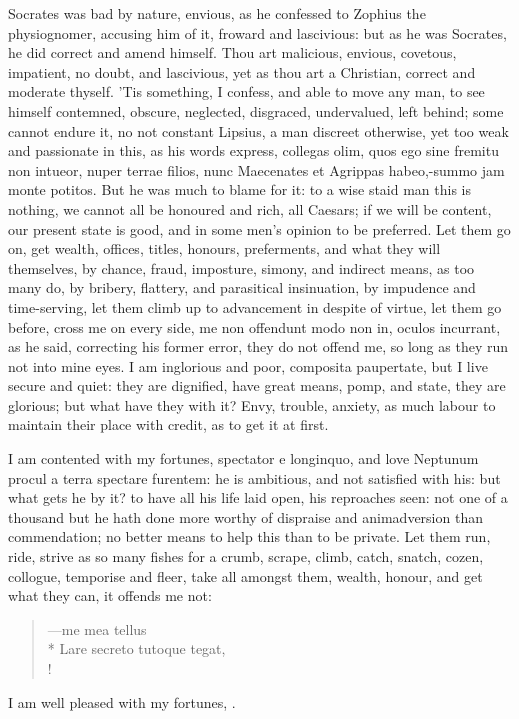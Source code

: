 {Socrates was bad by nature, envious, as he confessed to Zophius the
physiognomer, accusing him of it, froward and lascivious: but as he was
Socrates, he did correct and amend himself. Thou art malicious,
envious, covetous, impatient, no doubt, and lascivious, yet as thou art
a Christian, correct and moderate thyself. 'Tis something, I confess,
and able to move any man, to see himself contemned, obscure, neglected,
disgraced, undervalued, left behind; some cannot endure it, no
not constant Lipsius, a man discreet otherwise, yet too weak and
passionate in this, as his words express, collegas olim, quos ego
sine fremitu non intueor, nuper terrae filios, nunc Maecenates et
Agrippas habeo,-summo jam monte potitos. But he was much to blame for
it: to a wise staid man this is nothing, we cannot all be honoured and
rich, all Caesars; if we will be content, our present state is good,
and in some men's opinion to be preferred. Let them go on, get wealth,
offices, titles, honours, preferments, and what they will themselves,
by chance, fraud, imposture, simony, and indirect means, as too many
do, by bribery, flattery, and parasitical insinuation, by impudence and
time-serving, let them climb up to advancement in despite of virtue,
let them go before, cross me on every side, me non offendunt modo non
in, oculos incurrant, as he said, correcting his former error,
they do not offend me, so long as they run not into mine eyes. I am
inglorious and poor, composita paupertate, but I live secure and quiet:
they are dignified, have great means, pomp, and state, they are
glorious; but what have they with it? Envy, trouble, anxiety, as
much labour to maintain their place with credit, as to get it at first.

I am contented with my fortunes, spectator e longinquo, and love
Neptunum procul a terra spectare furentem: he is ambitious, and not
satisfied with his: but what gets he by it? to have all his life
laid open, his reproaches seen: not one of a thousand but he hath done
more worthy of dispraise and animadversion than commendation; no better
means to help this than to be private. Let them run, ride, strive as so
many fishes for a crumb, scrape, climb, catch, snatch, cozen, collogue,
temporise and fleer, take all amongst them, wealth, honour, and
get what they can, it offends me not:
%
%
\begin{latin}%
\begin{verse}%
---me mea tellus\\*
Lare secreto tutoque tegat,\\!
\end{verse}%
\end{latin}%
%
I am well pleased with my fortunes, .

}
